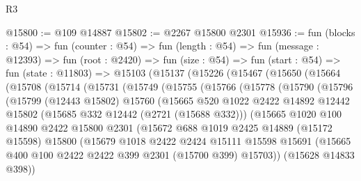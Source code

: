 \begin{lexlean}{R3}
\begin{coremodule}
@15800 := @109 @14887
@15802 := @2267 @15800 @2301
@15936 := fun (blocks : @54) =>
  fun (counter : @54) =>
  fun (length : @54) =>
  fun (message : @12393) =>
  fun (root : @2420) =>
  fun (size : @54) =>
  fun (start : @54) =>
  fun (state : @11803) =>
  @15103
    (@15137
      (@15226
        (@15467
          (@15650
            (@15664
              (@15708
                (@15714
                  (@15731
                    (@15749
                      (@15755
                        (@15766
                          (@15778
                            (@15790
                              (@15796
                                (@15799
                                  (@12443 @15802)
                                  @15760
                                  (@15665
                                    @520
                                    @1022
                                    @2422
                                    @14892
                                    @12442
                                    @15802
                                    (@15685 @332 @12442 (@2721 (@15688 @332)))
                                    (@15665
                                      @1020
                                      @100
                                      @14890
                                      @2422
                                      @15800
                                      @2301
                                      (@15672
                                        @688
                                        @1019
                                        @2425
                                        @14889
                                        (@15172 @15598)
                                        @15800
                                        (@15679
                                          @1018
                                          @2422
                                          @2424
                                          @15111
                                          @15598
                                          @15691
                                          (@15665
                                            @400
                                            @100
                                            @2422
                                            @2422
                                            @399
                                            @2301
                                            (@15700 @399)
                                            @15703))
                                        (@15628 @14833 @398))

\end{coremodule}
\end{lexlean}
